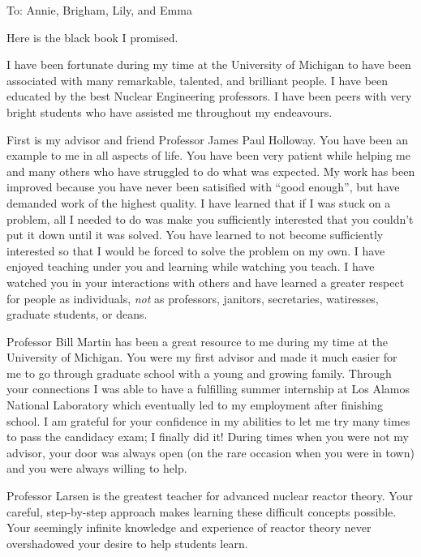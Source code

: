 \makecopyright

\begin{dedication}
  To: Annie, Brigham, Lily, and Emma
  
  Here is the black book I promised.
\end{dedication}

\begin{acknowledgments}
    I have been fortunate during my time at the University of Michigan to have been associated with many remarkable, talented, and brilliant people.  I have been educated by the best Nuclear Engineering professors.  I have been peers with very bright students who have assisted me throughout my endeavours.  
    
    First is my advisor and friend Professor James Paul Holloway.  You have been an example to me in all aspects of life.  You have been very patient while helping me and many others who have struggled to do what was expected.  My work has been improved because you have never been satisified with ``good enough'', but have demanded work of the highest quality.  I have learned that if I was stuck on a problem, all I needed to do was make you sufficiently interested that you couldn't put it down until it was solved.  You have learned to not become sufficiently interested so that I would be forced to solve the problem on my own.  I have enjoyed teaching under you and learning while watching you teach.  I have watched you in your interactions with others and have learned a greater respect for people as individuals, \emph{not} as professors, janitors, secretaries, watiresses, graduate students, or deans.

    Professor Bill Martin has been a great resource to me during my time at the University of Michigan.  You were my first advisor and made it much easier for me to go through graduate school with a young and growing family.  Through your connections I was able to have a fulfilling summer internship at Los Alamos National Laboratory which eventually led to my employment after finishing school.  I am grateful for your confidence in my abilities to let me try many times to pass the candidacy exam; I finally did it!  During times when you were not my advisor, your door was always open (on the rare occasion when you were in town) and you were always willing to help.

    Professor Larsen is the greatest teacher for advanced nuclear reactor theory.  Your careful, step-by-step approach makes learning these difficult concepts possible.  Your seemingly infinite knowledge and experience of reactor theory never overshadowed your desire to help students learn.  


\end{acknowledgments}
